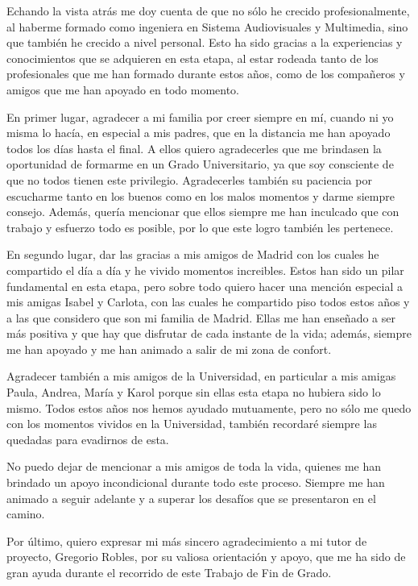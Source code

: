 \documentclass[a4paper, 12pt]{book}
\begin{document}
Echando la vista atrás me doy cuenta de que no sólo he crecido profesionalmente, al haberme formado como ingeniera en Sistema Audiovisuales y Multimedia, sino que también he crecido a nivel personal.
Esto ha sido gracias a la experiencias y conocimientos que se adquieren en esta etapa, al estar rodeada tanto de los profesionales que me han formado durante estos años, como de los compañeros y amigos que me han apoyado en todo momento.


En primer lugar, agradecer a mi familia por creer siempre en mí, cuando ni yo misma lo hacía, en especial a mis padres, que en la distancia me han apoyado todos los días hasta el final.
A ellos quiero agradecerles que me brindasen la oportunidad de formarme en un Grado Universitario, ya que soy consciente de que no todos tienen este privilegio.
Agradecerles también su paciencia por escucharme tanto en los buenos como en los malos momentos y darme siempre consejo.
Además, quería mencionar que ellos siempre me han inculcado que con trabajo y esfuerzo todo es posible, por lo que este logro también les pertenece.


En segundo lugar, dar las gracias a mis amigos de Madrid con los cuales he compartido el día a día y he vivido momentos increibles. 
Estos han sido un pilar fundamental en esta etapa, pero sobre todo quiero hacer una mención especial a mis amigas Isabel y Carlota, con las cuales he compartido piso todos estos años y a las que considero que son mi familia de Madrid.
Ellas me han enseñado a ser más positiva y que hay que disfrutar de cada instante de la vida; además, siempre me han apoyado y me han animado a salir de mi zona de confort.  


Agradecer también a mis amigos de la Universidad, en particular a mis amigas Paula, Andrea, María y Karol porque sin ellas esta etapa no hubiera sido lo mismo. 
Todos estos años nos hemos ayudado mutuamente, pero no sólo me quedo con los momentos vividos en la Universidad, también recordaré siempre las quedadas para evadirnos de esta. 


No puedo dejar de mencionar a mis amigos de toda la vida, quienes me han brindado un apoyo incondicional durante todo este proceso. 
Siempre me han animado a seguir adelante y a superar los desafíos que se presentaron en el camino.


Por último, quiero expresar mi más sincero agradecimiento a mi tutor de proyecto, Gregorio Robles, por su valiosa orientación y apoyo, que me ha sido de gran ayuda durante el recorrido de este Trabajo de Fin de Grado. 
\end{document}
